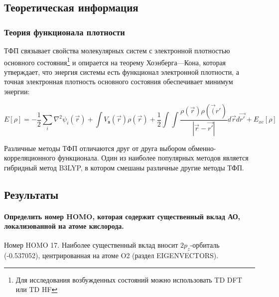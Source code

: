 \subsection{Теоретическая информация}
\subsubsection{Теория функционала плотности}
ТФП связывает свойства молекулярных систем с электронной плотностью основного состояния\footnote{Для исследования возбужденных состояний можно использовать TD DFT или TD HF} и опирается на теорему Хоэнберга—Кона, которая утверждает, что энергия системы есть функционал электронной плотности, а точная электронная плотность основного состояния обеспечивает минимум энергии:

\begin{equation}
    E[\rho] = -\frac{1}{2}\sum\limits_i\nabla^2\psi_i(\Vec{r}) + \int V_{я}(\Vec{r})\rho(\Vec{r}) + \frac{1}{2}\int\int\frac{\rho(\Vec{r})\rho(\Vec(r')}{|\Vec{r} - \Vec{r'}|}d\Vec{r}d\Vec{r'} + E_{xc}[\rho]
\end{equation}

Различные методы ТФП отличаются друг от друга выбором обменно-корреляционного функционала. Один из наиболее популярных методов является гибридный метод B3LYP, в котором смешаны различные другие методы ТФП. 


\subsection{Результаты}
\paragraph*{Определить номер HOMO, которая содержит существенный вклад АО, локализованной на атоме кислорода.}
Номер HOMO 17. Наиболее существенный вклад вносит $2p_z$-орбиталь (-0.537052), центрированная на атоме O2 (раздел EIGENVECTORS).
